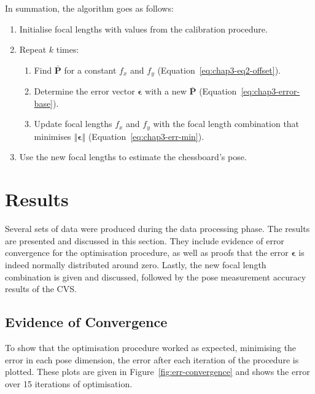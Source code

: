 In summation, the algorithm goes as follows: 

\begin{enumerate}
  \item Initialise focal lengths with values from the calibration procedure. 
  \item Repeat $k$ times:
  \begin{enumerate}
    \item Find $\bar{\bm{P}}$ for a constant $f_x$ and $f_y$ (Equation~\ref{eq:chap3-eq2-offset}).
    \item Determine the error vector $\bm{\epsilon}$ with a new $\bar{\bm{P}}$ (Equation~\ref{eq:chap3-error-base}).
    \item Update focal lengths $f_x$ and $f_y$ with the focal length combination that minimises $\left \Vert \bm{\epsilon} \right \Vert$ (Equation~\ref{eq:chap3-err-min}).
  \end{enumerate}
  \item Use the new focal lengths to estimate the chessboard's pose.
\end{enumerate}

\section{Results}

Several sets of data were produced during the data processing phase. The results are presented and discussed in this section. They include evidence of error convergence for the optimisation procedure, as well as proofs that the error $\bm{\epsilon}$ is indeed normally distributed around zero. Lastly, the new focal length combination is given and discussed, followed by the pose measurement accuracy results of the CVS. 

\subsection{Evidence of Convergence}

To show that the optimisation procedure worked as expected, minimising the error in each pose dimension, the error after each iteration of the procedure is plotted. These plots are given in Figure~\ref{fig:err-convergence} and shows the error over 15 iterations of optimisation.  

